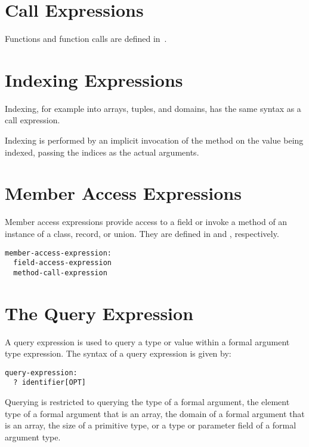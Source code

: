 \section{Call Expressions}
\label{Call_Expressions}

Functions and function calls are defined in~.

\section{Indexing Expressions}
\label{Indexing_Expressions}

Indexing, for example into arrays, tuples, and domains,
has the same syntax as a call expression.
 
Indexing is performed by an implicit invocation of the  method
on the value being indexed,
passing the indices as the actual arguments.

\section{Member Access Expressions}
\label{Member_Access_Expressions}

Member access expressions provide access to a field or invoke a method
of an instance of a class, record, or union.
They are defined in  and
, respectively.

\begin{syntax}
\begin{verbatim}
member-access-expression:
  field-access-expression
  method-call-expression
\end{verbatim}
\end{syntax}

\section{The Query Expression}
\label{The_Query_Expression}

A query expression is used to query a type or value within a formal
argument type expression.  The syntax of a query expression is given
by:
\begin{syntax}
\begin{verbatim}
query-expression:
  ? identifier[OPT]
\end{verbatim}
\end{syntax}
Querying is restricted to querying the type of a formal argument, the
element type of a formal argument that is an array, the domain of a
formal argument that is an array, the size of a primitive type, or a
type or parameter field of a formal argument type.

